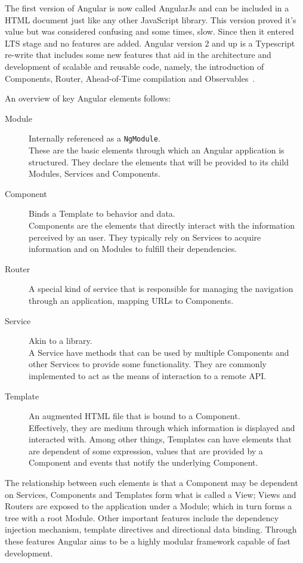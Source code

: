 The first version of Angular is now called AngularJs and can be included in a \gls{HTML} document just like any other JavaScript library. This version proved it's value but was considered confusing and some times, slow. Since then it entered \gls{LTS} stage and no features are added. Angular version 2 and up is a Typescript re-write that includes some new features that aid in the architecture and development of scalable and reusable code, namely, the introduction of Components, Router, Ahead-of-Time compilation and Observables~\cite{angular}.

An overview of key Angular elements follows:

\begin{description}
\item[Module] Internally referenced as a \texttt{NgModule}. \\
  These are the basic elements through which an Angular application is structured\cite{angularmodule}. They declare the elements that will be provided to its child Modules, Services and Components.
\item[Component] Binds a Template to behavior and data.\\ Components are the elements that directly interact with the information perceived by an user. They typically rely on Services to acquire information and on Modules to fulfill their dependencies. 
\item[Router] A special kind of service that is responsible for managing the navigation through an application, mapping \gls{URL}s to Components.
\item[Service] Akin to a library.\\ A Service have methods that can be used by multiple Components and other Services to provide some functionality. They are commonly implemented to act as the means of interaction to a remote \gls{API}.
\item[Template] An augmented \gls{HTML} file that is bound to a Component.\\
  Effectively, they are medium through which information is displayed and interacted with. Among other things, Templates can have elements that are dependent of some expression, values that are provided by a Component and events that notify the underlying Component.
\end{description}

The relationship between such elements is that a Component may be dependent on Services, Components and Templates form what is called a View; Views and Routers are exposed to the application under a Module; which in turn forms a tree with a root Module.
Other important features include the dependency injection mechanism, template directives and directional data binding. Through these features Angular aims to be a highly modular framework capable of fast development.

